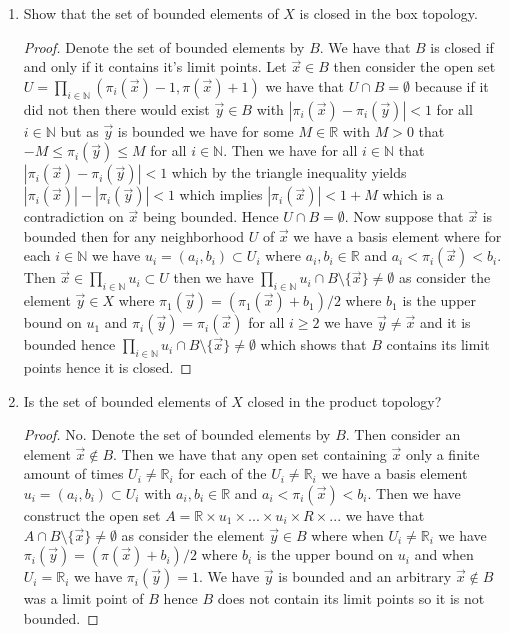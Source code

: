 \documentclass{amsart}
\theoremstyle{plain}
\theoremstyle{definition}
\theoremstyle{remark}
\begin{document}
\begin{enumerate}
\begin{proof}
    \end{proof}
    \item Show that the set of bounded elements of $X$ is closed in the box topology.
    \begin{proof}
    Denote the set of bounded elements by $B$. We have that $B$ is closed if and only if it contains it's limit points. Let $\vec{x} \in B$ then consider the open set $U=\prod_{i\in \mathbb{N}}(\pi_i(\vec{x})-1,\pi(\vec{x})+1)$ we have that $U\cap B=\emptyset$ because if it did not then there would exist $\vec{y}\in B$ with $|\pi_i(\vec{x})-\pi_i(\vec{y})|<1$ for all $i\in \mathbb{N}$ but as $\vec{y}$ is bounded we have for some $M\in \mathbb{R}$ with $M>0$ that $-M\leq \pi_i(\vec{y})\leq M$ for all $i\in \mathbb{N}$. Then we have for all $i\in \mathbb{N}$ that $|\pi_i(\vec{x})-\pi_i(\vec{y})|<1$ which by the triangle inequality yields $|\pi_i(\vec{x})|-|\pi_i(\vec{y})|<1$ which implies $|\pi_i(\vec{x})|<1+M$ which is a contradiction on $\vec{x}$ being bounded. Hence $U\cap B=\emptyset$. Now suppose that $\vec{x}$ is bounded then for any neighborhood $U$ of $\vec{x}$ we have a basis element where for each $i \in \mathbb{N}$ we have $u_i=(a_i,b_i)\subset U_i$ where $a_i,b_i\in \mathbb{R}$ and $a_i<\pi_i(\vec{x})<b_i$. Then $\vec{x}\in \prod_{i\in \mathbb{N}}u_i\subset U$ then we have $\prod_{i\in \mathbb{N}}u_i\cap B\setminus \{\vec{x}\}\not = \emptyset$ as consider the element $\vec{y}\in X$ where $\pi_1(\vec{y})=(\pi_1(\vec{x})+b_1)/2$ where $b_1$ is the upper bound on $u_1$ and $\pi_i(\vec{y})=\pi_i(\vec{x})$ for all $i\geq 2$ we have $\vec{y}\not = \vec{x}$ and it is bounded hence $\prod_{i\in \mathbb{N}}u_i\cap B\setminus \{\vec{x}\}\not = \emptyset$ which shows that $B$ contains its limit points hence it is closed.
    \end{proof}
        
    \item Is the set of bounded elements of $X$ closed in the product topology?
    \begin{proof}
        No. Denote the set of bounded elements by $B$. Then consider an element $\vec{x}\not \in B$. Then we have that any open set containing $\vec{x}$ only a finite amount of times $U_i\not = \mathbb{R}_i$ for each of the $U_i\not = \mathbb{R}_i$ we have a basis element $u_i=(a_i,b_i)\subset U_i$ with $a_i,b_i\in \mathbb{R}$ and $a_i<\pi_i(\vec{x})<b_i$. Then we have construct the open set $A=\mathbb{R}\times u_1\times...\times u_i\times R\times ...$ we have that $A\cap B\setminus \{\vec{x}\}\not = \emptyset$ as consider the element $\vec{y}\in B$ where  when $U_i\not = \mathbb{R}_i$ we have $\pi_i(\vec{y})=(\pi(\vec{x})+b_i)/2$ where $b_i$ is the upper bound on $u_i$ and when $U_i=\mathbb{R}_i$ we have $\pi_i(\vec{y})=1$. We have $\vec{y}$ is bounded and an arbitrary $\vec{x}\not \in B$ was a limit point of $B$ hence $B$ does not contain its limit points so it is not bounded. 
    \end{proof}
    
\end{enumerate}
\end{document}
